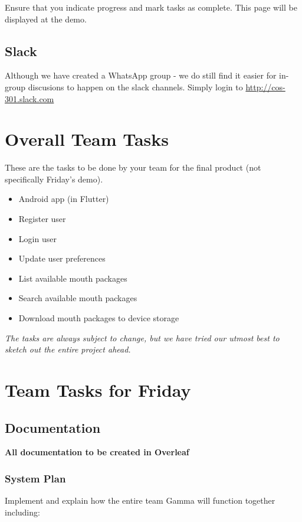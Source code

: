 \documentclass{article}
\begin{document}
Ensure that you indicate progress and mark tasks as complete. This page will be displayed at the demo.

\subsection{Slack}
Although we have created a WhatsApp group - we do still find it easier for in-group discusions to happen on the slack channels. Simply login to \url{http://cos-301.slack.com}

\newpage

\section{Overall Team Tasks}
These are the tasks to be done by your team for the final product (not specifically Friday's demo).

\begin{itemize}
    \item Android app (in Flutter)
    \item Register user
    \item Login user
    \item Update user preferences
    \item List available mouth packages
    \item Search available mouth packages
    \item Download mouth packages to device storage

\end{itemize}

\vspace{1cm}

\begin{center}
   \textit{The tasks are always subject to change, but we have tried our utmost best to sketch out the entire project ahead.}
\end{center}

\newpage


\section{Team Tasks for Friday}

\subsection{Documentation}
\textbf{All documentation to be created in Overleaf}

\subsubsection{System Plan}
Implement and explain how the entire team Gamma will function together including:
\end{document}
